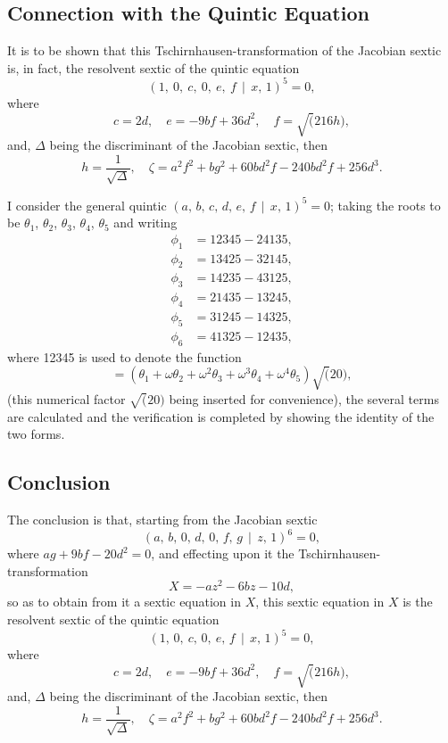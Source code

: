 \documentclass[11pt,a4paper]{article}
\theoremstyle{cayley}
\begin{document}
\subsection*{Connection with the Quintic Equation}

It is to be shown that this Tschirnhausen-transformation of the Jacobian sextic is, in fact, the resolvent sextic of the quintic equation
\[
(1,\ 0,\ c,\ 0,\ e,\ f \,\!\!\mid\!\!\, x,\, 1)^{5} = 0,
\]
where
\[
c = 2d,\quad e = -9bf + 36d^{2},\quad f = \surd(216h),
\]
and, $\Delta$ being the discriminant of the Jacobian sextic, then
\[
h = \frac{1}{\sqrt{\Delta}},\quad \zeta = a^{2}f^{2} + bg^{2} + 60bd^{2}f - 240bd^{2}f + 256d^{3}.
\]

I consider the general quintic $(a,\, b,\, c,\, d,\, e,\, f \,\!\!\mid\!\!\, x,\, 1)^{5} = 0$; taking the roots to be $\theta_{1}$, $\theta_{2}$, $\theta_{3}$, $\theta_{4}$, $\theta_{5}$ and writing
\begin{align*}
\phi_{1} &= 12345 - 24135,\\
\phi_{2} &= 13425 - 32145,\\
\phi_{3} &= 14235 - 43125,\\
\phi_{4} &= 21435 - 13245,\\
\phi_{5} &= 31245 - 14325,\\
\phi_{6} &= 41325 - 12435,
\end{align*}
where 12345 is used to denote the function
\[
=(\theta_{1}+\omega\theta_{2}+\omega^{2}\theta_{3}+\omega^{3}\theta_{4}+\omega^{4}\theta_{5})\surd(20),
\]
(this numerical factor $\surd(20)$ being inserted for convenience), the several terms are calculated and the verification is completed by showing the identity of the two forms.

\subsection*{Conclusion}

The conclusion is that, starting from the Jacobian sextic
\[
(a,\, b,\, 0,\, d,\, 0,\, f,\, g \,\!\!\mid\!\!\, z,\, 1)^{6} = 0,
\]
where $ag + 9bf - 20d^{2} = 0$, and effecting upon it the Tschirnhausen-transformation
\[
X = -az^{2} - 6bz - 10d,
\]
so as to obtain from it a sextic equation in $X$, this sextic equation in $X$ is the resolvent sextic of the quintic equation
\[
(1,\, 0,\ c,\, 0,\ e,\, f \,\!\!\mid\!\!\, x,\, 1)^{5} = 0,
\]
where
\[
c = 2d,\quad e = -9bf + 36d^{2},\quad f = \surd(216h),
\]
and, $\Delta$ being the discriminant of the Jacobian sextic, then
\[
h = \frac{1}{\sqrt{\Delta}},\quad \zeta = a^{2}f^{2} + bg^{2} + 60bd^{2}f - 240bd^{2}f + 256d^{3}.
\]
\end{document}
